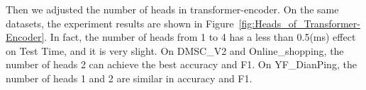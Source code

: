 Then we adjusted the number of heads in transformer-encoder. On the same datasets, the experiment results are shown in Figure~\ref{fig:Heads_of_Transformer-Encoder}. In fact, the number of heads from 1 to 4 has a less than 0.5(ms) effect on Test Time, and it is very slight. On DMSC\_V2 and Online\_shopping, the number of heads 2 can achieve the best accuracy and F1. On YF\_DianPing, the number of heads 1 and 2 are similar in accuracy and F1.


